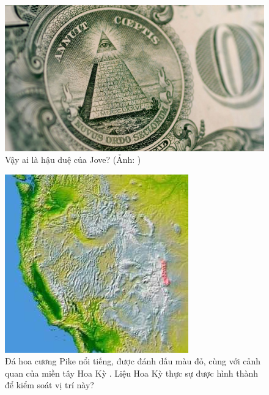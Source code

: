 \documentclass[10pt,twocolumn,letterpaper]{article}
\begin{document}
\begin{figure}[t]
\begin{center}
   \includegraphics[width=1\linewidth]{illuminati.jpg}
\end{center}
   \caption{Vậy ai là hậu duệ của Jove? (Ảnh: \cite{35})}
\label{fig:10}
\label{fig:onecol}
\end{figure}

\begin{figure}[t]
\begin{center}
   \includegraphics[width=1\linewidth]{pike.jpg}
\end{center}
   \caption{Đá hoa cương Pike nổi tiếng, được đánh dấu màu đỏ, cùng với cảnh quan của miền tây Hoa Kỳ \cite{36}. Liệu Hoa Kỳ thực sự được hình thành để kiểm soát vị trí này?}
\label{fig:11}
\label{fig:onecol}
\end{figure}
\end{document}
